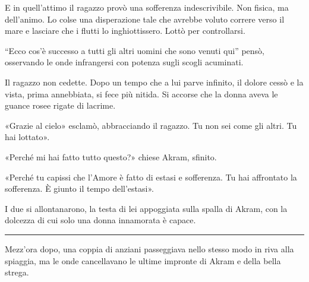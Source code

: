 E in quell'attimo il ragazzo provò una sofferenza indescrivibile. Non fisica, ma dell'animo. Lo
colse una disperazione tale che avrebbe voluto correre verso il mare e lasciare che i flutti lo
inghiottissero. Lottò per controllarsi.

``Ecco cos'è successo a tutti gli altri uomini che sono venuti qui'' pensò, osservando le onde
infrangersi con potenza sugli scogli acuminati.

Il ragazzo non cedette. Dopo un tempo che a lui parve infinito, il dolore cessò e la vista, prima
annebbiata, si fece più nitida. Si accorse che la donna aveva le guance rosee rigate di lacrime.

«Grazie al cielo» esclamò, abbracciando il ragazzo. Tu non sei come gli altri. Tu hai lottato».

«Perché mi hai fatto tutto questo?» chiese Akram, sfinito.

«Perché tu capissi che l'Amore è fatto di estasi e sofferenza. Tu hai affrontato la sofferenza. È
giunto il tempo dell'estasi».

I due si allontanarono, la testa di lei appoggiata sulla spalla di Akram, con la dolcezza di cui
solo una donna innamorata è capace.

\plainbreak{1}

Mezz'ora dopo, una coppia di anziani passeggiava nello stesso modo in riva alla spiaggia, ma le onde
cancellavano le ultime impronte di Akram e della bella strega.
